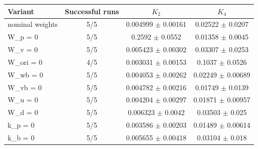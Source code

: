 \begin{tabular}{lccc}
\toprule
Variant & Successful runs & $K_2$ & $K_4$ \\
\midrule
nominal weights & 5/5 & 0.004999 $\pm$ 0.00161 & 0.02522 $\pm$ 0.0207 \\
W_p = 0 & 5/5 & 0.2592 $\pm$ 0.0552 & 0.01358 $\pm$ 0.0045 \\
W_v = 0 & 5/5 & 0.005423 $\pm$ 0.00302 & 0.03307 $\pm$ 0.0253 \\
W_ori = 0 & 4/5 & 0.003031 $\pm$ 0.00153 & 0.1037 $\pm$ 0.0526 \\
W_wb = 0 & 5/5 & 0.004053 $\pm$ 0.00262 & 0.02249 $\pm$ 0.00689 \\
W_vb = 0 & 5/5 & 0.004782 $\pm$ 0.00216 & 0.01749 $\pm$ 0.0139 \\
W_u = 0 & 5/5 & 0.004204 $\pm$ 0.00297 & 0.01871 $\pm$ 0.00957 \\
W_d = 0 & 5/5 & 0.006323 $\pm$ 0.0042 & 0.03503 $\pm$ 0.025 \\
k_p = 0 & 5/5 & 0.003586 $\pm$ 0.00203 & 0.01489 $\pm$ 0.00614 \\
k_b = 0 & 5/5 & 0.005655 $\pm$ 0.00418 & 0.03104 $\pm$ 0.018 \\
\bottomrule
\end{tabular}
